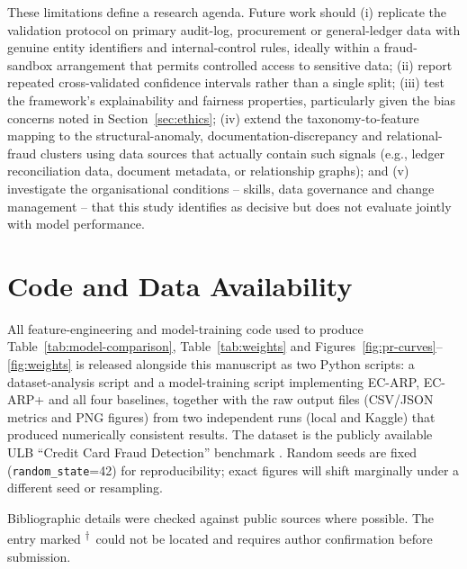 \documentclass[preprint,12pt]{elsarticle}
\newcommand{\rvr}{\textsuperscript{$\dagger$}}
\begin{document}
These limitations define a research agenda. Future work should (i) replicate the validation protocol on primary audit-log, procurement or general-ledger data with genuine entity identifiers and internal-control rules, ideally within a fraud-sandbox arrangement that permits controlled access to sensitive data; (ii) report repeated cross-validated confidence intervals rather than a single split; (iii) test the framework's explainability and fairness properties, particularly given the bias concerns noted in Section~\ref{sec:ethics}; (iv) extend the taxonomy-to-feature mapping to the structural-anomaly, documentation-discrepancy and relational-fraud clusters using data sources that actually contain such signals (e.g., ledger reconciliation data, document metadata, or relationship graphs); and (v) investigate the organisational conditions -- skills, data governance and change management -- that this study identifies as decisive but does not evaluate jointly with model performance.

\section*{Code and Data Availability}
All feature-engineering and model-training code used to produce Table~\ref{tab:model-comparison}, Table~\ref{tab:weights} and Figures~\ref{fig:pr-curves}--\ref{fig:weights} is released alongside this manuscript as two Python scripts: a dataset-analysis script and a model-training script implementing EC-ARP, EC-ARP+ and all four baselines, together with the raw output files (CSV/JSON metrics and PNG figures) from two independent runs (local and Kaggle) that produced numerically consistent results. The dataset is the publicly available ULB ``Credit Card Fraud Detection'' benchmark \citep{dalpozzolo2015}. Random seeds are fixed (\texttt{random\_state}=42) for reproducibility; exact figures will shift marginally under a different seed or resampling.

\noindent Bibliographic details were checked against public sources where possible. The entry marked \rvr\ could not be located and requires author confirmation before submission.
\end{document}
